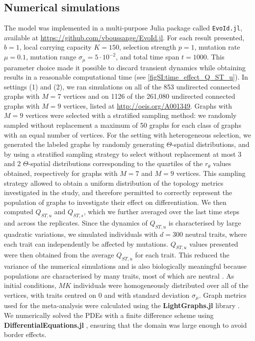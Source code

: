 \subsection{Numerical simulations}
The model was implemented in a multi-purpose Julia package called \texttt{EvoId.jl}, available at \href{https://github.com/vboussange/EvoId.jl}{https://github.com/vboussange/EvoId.jl}. For each result presented, $b = 1$, local carrying capacity $K = 150$, selection strength $p = 1$, mutation rate $\mu=0.1$, mutation range $\sigma_\mu = 5 \cdot 10^{-2}$, and total time span $t = 1000$. This parameter choice made it possible to discard transient dynamics while obtaining results in a reasonable computational time (see \cref{figSI:time_effect_Q_ST_u}).
%
In settings (1) and (2), we ran simulations on all of the 853 undirected connected graphs with $M=7$ vertices and on 1126 of the 261,080 undirected connected graphs with $M=9$ vertices, listed at \href{http://oeis.org/A001349}{http://oeis.org/A001349}. Graphs with $M = 9$ vertices were selected with a stratified sampling method: we randomly sampled without replacement a maximum of 50 graphs for each class of graphs with an equal number of vertices. For the setting with heterogeneous selection, we generated the labeled graphs by randomly generating $\Theta$-spatial distributions, and by using a stratified sampling strategy to select without replacement at most 3 and 2 $\Theta$-spatial distributions corresponding to the quartiles of the $r_\theta$ values obtained, respectively for graphs with $M=7$ and $M=9$ vertices. This sampling strategy allowed to obtain a uniform distribution of the topology metrics investigated in the study, and therefore permitted to correctly represent the population of graphs to investigate their effect on differentiation.
%
We then computed $Q_{ST,u}$ and $Q_{ST,s}$, which we further averaged over the last time steps and across the replicates.
%
Since the dynamics of $Q_{ST,u}$ is characterised by large quadratic variations, we simulated individuals with $d = 300$ neutral traits, where each trait can independently be affected by mutations. $Q_{ST,u}$ values presented were then obtained from the average $Q_{ST,u}$ for each trait. This reduced the variance of the numerical simulations and is also biologically meaningful because populations are characterised by many traits, most of which are neutral \cite{Holderegger2006}.
%
As initial conditions, $MK$ individuals were homogeneously distributed over all of the vertices, with traits centred on 0 and with standard deviation $\sigma_\mu$.
%
Graph metrics used for the meta-analysis were calculated using the \textbf{LightGraphs.jl} library \cite{Bromberger2017}. We numerically solved the PDEs with a finite difference scheme using \textbf{DifferentialEquations.jl} \cite{Rackauckas2017}, ensuring that the domain was large enough to avoid border effects.

